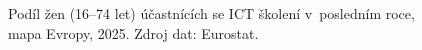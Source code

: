 \def\strEuIctGenderTitle{Účast žen v ICT školení (2025)}%
\def\strEuIctGenderColorbarLabel{podíl žen (16--74 let) [\%]}%
\providecommand\NudgeEuIctGenderCz{0pt}%
\providecommand\NudgeEuIctGenderAt{0pt}%
\providecommand\NudgeEuIctGenderDe{0pt}%
\providecommand\NudgeEuIctGenderDk{0pt}%
\providecommand\NudgeEuIctGenderPl{0pt}%
\providecommand\NudgeEuIctGenderSk{0pt}%
\def\strEuIctGenderCaption{Podíl žen (16--74 let) účastnících se \acs{ICT} školení v~posledním roce, mapa Evropy, 2025. Zdroj dat: Eurostat.~\cite{eurostat_isoc_sks_itsps}}%
%
\begin{figure}[htbp]
  \centering
  \resizebox{\linewidth}{!}{}
  \caption{\strEuIctGenderCaption}
  \label{fig:eu_ict_gender}
\end{figure}
